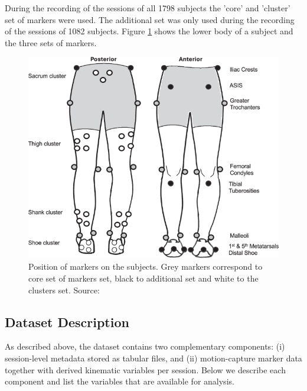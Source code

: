 During the recording of the sessions of all 1798 subjects the 'core' and 'cluster' set of markers were used. The additional set was only used during the recording of the sessions of 1082 subjects. Figure \ref{fig:marker_position} shows the lower body of a subject and the three sets of markers.

\begin{figure}[ht]
    \begin{centering}
    \includegraphics[width=0.5\columnwidth]{images/billateral_marker_position.png}
    \par\end{centering}
    \caption{Position of markers on the subjects. Grey markers correspond to core set of markers set, black to additional set and white to the clusters set. Source: \citet{Ferber2024}}
    \label{fig:marker_position}
\end{figure}


\subsection{Dataset Description}\label{subsec:method-dataset-description}
As described above, the dataset contains two complementary components: (i) session-level metadata stored as tabular files, and (ii) motion-capture marker data together with derived kinematic variables per session. Below we describe each component and list the variables that are available for analysis.


